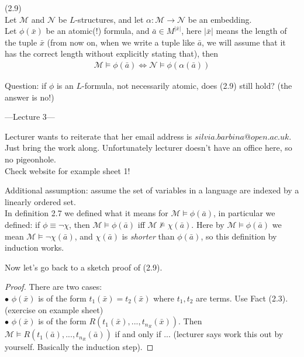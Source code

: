 \documentclass[a4paper]{article}
\begin{document}
\begin{prop} (2.9)\\
    Let $\mathcal{M}$ and $\mathcal{N}$ be $L$-structures, and let $\alpha: \mathcal{M} \to \mathcal{N}$ be an embedding.\\
    Let $\phi(\bar{x})$ be an atomic(!) formula, and $\bar{a} \in M^{|\bar{x}|}$, here $|\bar{x}|$ means the length of the tuple $\bar{x}$ (from now on, when we write a tuple like $\bar{a}$, we will assume that it has the correct length without explicitly stating that), then
    \begin{equation*}
        \begin{aligned}
            \mathcal{M} \vDash \phi(\bar{a}) \iff \mathcal{N} \vDash \phi(\alpha(\bar{a}))
        \end{aligned}
    \end{equation*}
\end{prop}

Question: if $\phi$ is an $L$-formula, not necessarily atomic, does (2.9) still hold? (the answer is no!)

---Lecture 3---

Lecturer wants to reiterate that her email address is $silvia.barbina@open.ac.uk$.\\
Just bring the work along. Unfortunately lecturer doesn't have an office here, so no pigeonhole.\\
Check website for example sheet 1!

Additional assumption: assume the set of variables in a language are indexed by a linearly ordered set.\\
In definition 2.7 we defined what it means for $\mathcal{M} \vDash\phi(\bar{a})$, in particular we defined: if $\phi \equiv \neg \chi$, then $\mathcal{M} \vDash \phi(\bar{a})$ iff $\mathcal{M} \not\vDash \chi(\bar{a})$. Here by $\mathcal{M} \vDash \phi(\bar{a})$ we mean $\mathcal{M} \vDash \neg\chi(\bar{a})$, and $\chi(\bar{a})$ is \emph{shorter} than $\phi(\bar{a})$, so this definition by induction works.

Now let's go back to a sketch proof of (2.9).
\begin{proof}
    There are two cases:\\
    $\bullet$ $\phi(\bar{x})$ is of the form $t_1(\bar{x}) = t_2(\bar{x})$ where $t_1,t_2$ are terms. Use Fact (2.3). (exercise on example sheet)\\
    $\bullet$ $\phi(\bar{x})$ is of the form $R(t_1(\bar{x}),...,t_{n_R} (\bar{x}))$. Then $\mathcal{M} \vDash R(t_1(\bar{a}),...,t_{n_R}(\bar{a}))$ if and only if ... (lecturer says work this out by yourself. Basically the induction step).
\end{proof}
\end{document}
